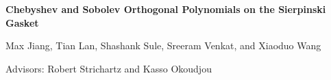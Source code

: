 \documentclass[a0, landscape]{a0poster}
\begin{document}
\begin{minipage}{\linewidth}
    \begin{center}
    \linespread{1.5}
    \color{CornellRed} \Huge \textbf{Chebyshev and Sobolev Orthogonal Polynomials on the Sierpinski Gasket}
        
                \color{Black}
                \LARGE  Max Jiang, Tian Lan, Shashank Sule, Sreeram Venkat, and Xiaoduo Wang
                
                
                \LARGE  Advisors: Robert Strichartz and Kasso Okoudjou
                
                
                \end{center}
  \end{minipage}
\end{document}
